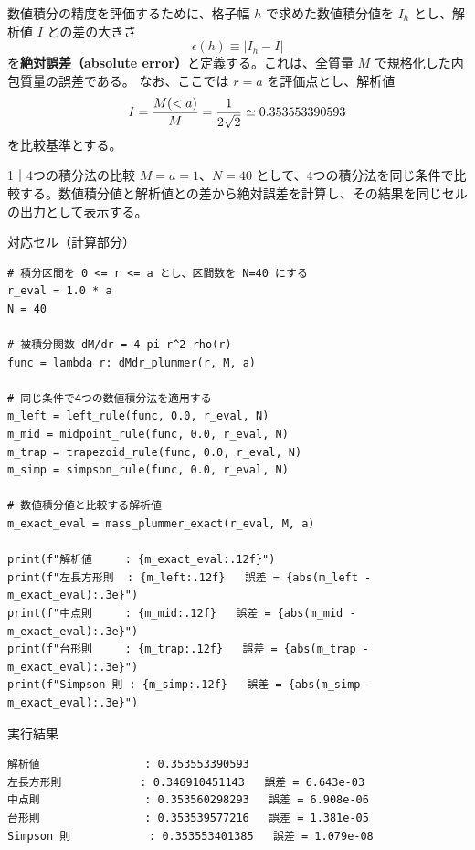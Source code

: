 数値積分の精度を評価するために、格子幅 $h$ で求めた数値積分値を $I_h$ とし、解析値 $I$ との差の大きさ
\begin{equation}
 \epsilon(h)\equiv |I_h-I|
\label{eq:ch1-absolute-error}
\end{equation}
を\textbf{絶対誤差（absolute error）}と定義する。これは、全質量 $M$ で規格化した内包質量の誤差である。
なお、ここでは $r=a$ を評価点とし、解析値
\begin{equation}
 I=\frac{M(<a)}{M}=\frac{1}{2\sqrt{2}}
 \simeq 0.353553390593
\label{eq:ch1-mass-at-a}
\end{equation}
を比較基準とする。

\begin{notebookblock}{1｜4つの積分法の比較}
$M=a=1$、$N=40$ として、4つの積分法を同じ条件で比較する。数値積分値と解析値との差から絶対誤差を計算し、その結果を同じセルの出力として表示する。

{\sffamily\small\color{graytext}対応セル（計算部分）}
\begin{Verbatim}[xleftmargin=2mm,fontsize=\small,frame=single,framesep=1.8mm,framerule=0.35pt,rulecolor=\color{listingframe},fillcolor=\color{listingbg}]
# 積分区間を 0 <= r <= a とし、区間数を N=40 にする
r_eval = 1.0 * a
N = 40

# 被積分関数 dM/dr = 4 pi r^2 rho(r)
func = lambda r: dMdr_plummer(r, M, a)

# 同じ条件で4つの数値積分法を適用する
m_left = left_rule(func, 0.0, r_eval, N)
m_mid = midpoint_rule(func, 0.0, r_eval, N)
m_trap = trapezoid_rule(func, 0.0, r_eval, N)
m_simp = simpson_rule(func, 0.0, r_eval, N)

# 数値積分値と比較する解析値
m_exact_eval = mass_plummer_exact(r_eval, M, a)

print(f"解析値     : {m_exact_eval:.12f}")
print(f"左長方形則  : {m_left:.12f}   誤差 = {abs(m_left - m_exact_eval):.3e}")
print(f"中点則     : {m_mid:.12f}   誤差 = {abs(m_mid - m_exact_eval):.3e}")
print(f"台形則     : {m_trap:.12f}   誤差 = {abs(m_trap - m_exact_eval):.3e}")
print(f"Simpson 則 : {m_simp:.12f}   誤差 = {abs(m_simp - m_exact_eval):.3e}")
\end{Verbatim}

{\sffamily\small\color{graytext}実行結果}
\begin{Verbatim}[numbers=none,fontsize=\small]
解析値                : 0.353553390593
左長方形則            : 0.346910451143   誤差 = 6.643e-03
中点則                : 0.353560298293   誤差 = 6.908e-06
台形則                : 0.353539577216   誤差 = 1.381e-05
Simpson 則            : 0.353553401385   誤差 = 1.079e-08
\end{Verbatim}
\end{notebookblock}

